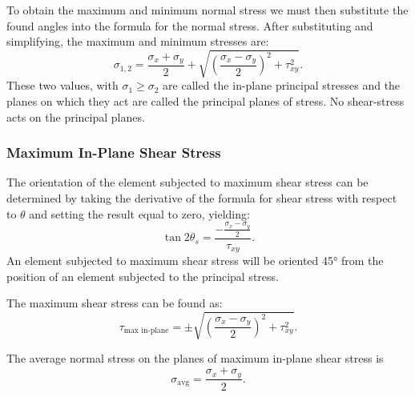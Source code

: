 To obtain the maximum and minimum normal stress we must then substitute the found angles into the formula for the normal stress.
After substituting and simplifying, the maximum and minimum stresses are:
\begin{equation*}
  \sigma_{1,2} = \frac{\sigma_x + \sigma_y}{2} + \sqrt{\left( \frac{\sigma_x - \sigma_y}{2} \right)^2 + \tau_{xy}^2}
.\end{equation*}
These two values, with $\sigma_1 \geq \sigma_2$ are called the in-plane principal stresses and the planes on which they act are called the principal planes of stress.
No shear-stress acts on the principal planes.


\subsubsection{Maximum In-Plane Shear Stress}
The orientation of the element subjected to maximum shear stress can be determined by taking the derivative of the formula for shear stress with respect to $\theta$ and setting the result equal to zero, yielding:
\begin{equation*}
  \tan 2 \theta_s = \frac{- \frac{\sigma_x - \sigma_y}{2}}{\tau_{xy}}
.\end{equation*}
An element subjected to maximum shear stress will be oriented \ang{45} from the position of an element subjected to the principal stress.

The maximum shear stress can be found as:
\begin{equation*}
  \tau_{\text{max in-plane}} = \pm \sqrt{\left( \frac{\sigma_x - \sigma_y}{2} \right)^2 + \tau_{xy}^2}
.\end{equation*}

The average normal stress on the planes of maximum in-plane shear stress is
\begin{equation*}
  \sigma_{\mathrm{avg}} = \frac{\sigma_x + \sigma_y}{2}
.\end{equation*}


